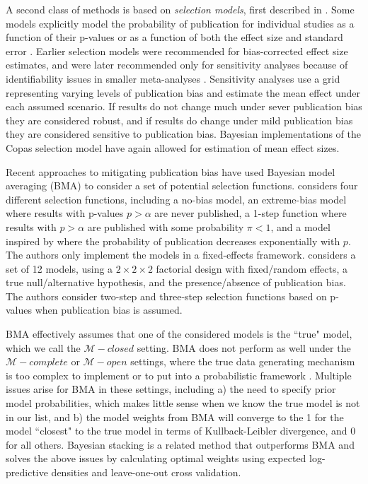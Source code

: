 \documentclass[12pt]{article}   	%
\numberwithin{equation}{section}
\begin{document}
A second class of methods is based on \textit{selection models}, first described in \citet{hedges1984selection}. Some models explicitly model the probability of publication for individual studies as a function of their p-values \citep{hedges1992selection, givens1997, vevea1995pubbias} or as a function of both the effect size and standard error \citep{copas1999what, copas2000funnel, copas2001sensitivity}. Earlier selection models were recommended for bias-corrected effect size estimates, and were later recommended only for sensitivity analyses because of identifiability issues in smaller meta-analyses \citep{vevea2005sensitivity, jin2015methods}. Sensitivity analyses use a grid representing varying levels of publication bias and estimate the mean effect under each assumed scenario. If results do not change much under sever publication bias they are considered robust, and if results do change under mild publication bias they are considered sensitive to publication bias. Bayesian implementations of the Copas selection model \citep{mavridis2013copas, bai2020} have again allowed for estimation of mean effect sizes.

Recent approaches to mitigating publication bias have used Bayesian model averaging (BMA) to consider a set of potential selection functions. \citet{guan2016} considers four different selection functions, including a no-bias model, an extreme-bias model where results with p-values $p > \alpha$ are never published, a 1-step function where results with $p > \alpha$ are published with some probability $\pi < 1$, and a model inspired by \citet{givens1997} where the probability of publication decreases exponentially with $p$. The authors only implement the models in a fixed-effects framework. \citet{maier2020robma} considers a set of 12 models, using a $2 \times 2 \times 2$ factorial design with fixed/random effects, a true null/alternative hypothesis, and the presence/absence of publication bias. The authors consider two-step and three-step selection functions based on p-values when publication bias is assumed. 

BMA effectively assumes that one of the considered models is the ``true" model, which we call the $\mathcal{M}-closed$ setting. BMA does not perform as well under the $\mathcal{M}-complete$ or $\mathcal{M}-open$ settings, where the true data generating mechanism is too complex to implement or to put into a probabilistic framework \citep{clyde2013bma}. Multiple issues arise for BMA in these settings, including a) the need to specify prior model probabilities, which makes little sense when we know the true model is not in our list, and b) the model weights from BMA will converge to the  1 for the model ``closest" to the true model in terms of Kullback-Leibler divergence, and 0 for all others. Bayesian stacking \citep{yao2018stacking, yao2021hierarchical} is a related method that outperforms BMA and solves the above issues by calculating optimal weights using expected log-predictive densities and leave-one-out cross validation. 
\end{document}
